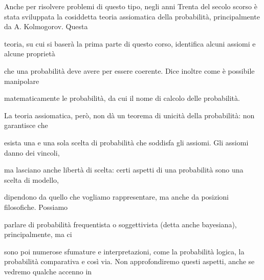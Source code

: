 \documentclass[a4paper,portrait,12pt]{article}
\begin{document}
\begin{flushleft}
Anche per risolvere problemi di questo tipo, negli anni Trenta del secolo scorso \`{e} stata sviluppata la cosiddetta teoria assiomatica della probabilit\`{a}, principalmente da A. Kolmogorov. Questa
\end{flushleft}


\begin{flushleft}
teoria, su cui si baser\`{a} la prima parte di questo corso, identifica alcuni assiomi e alcune propriet\`{a}
\end{flushleft}


\begin{flushleft}
che una probabilit\`{a} deve avere per essere coerente. Dice inoltre come \`{e} possibile manipolare
\end{flushleft}


\begin{flushleft}
matematicamente le probabilit\`{a}, da cui il nome di calcolo delle probabilit\`{a}.
\end{flushleft}


\begin{flushleft}
La teoria assiomatica, per\`{o}, non d\`{a} un teorema di unicit\`{a} della probabilit\`{a}: non garantisce che
\end{flushleft}


\begin{flushleft}
esista una e una sola scelta di probabilit\`{a} che soddisfa gli assiomi. Gli assiomi danno dei vincoli,
\end{flushleft}


\begin{flushleft}
ma lasciano anche libert\`{a} di scelta: certi aspetti di una probabilit\`{a} sono una scelta di modello,
\end{flushleft}


\begin{flushleft}
dipendono da quello che vogliamo rappresentare, ma anche da posizioni filosofiche. Possiamo
\end{flushleft}


\begin{flushleft}
parlare di probabilit\`{a} frequentista o soggettivista (detta anche bayesiana), principalmente, ma ci
\end{flushleft}


\begin{flushleft}
sono poi numerose sfumature e interpretazioni, come la probabilit\`{a} logica, la probabilit\`{a} comparativa e così via. Non approfondiremo questi aspetti, anche se vedremo qualche accenno in
\end{flushleft}
\end{document}
